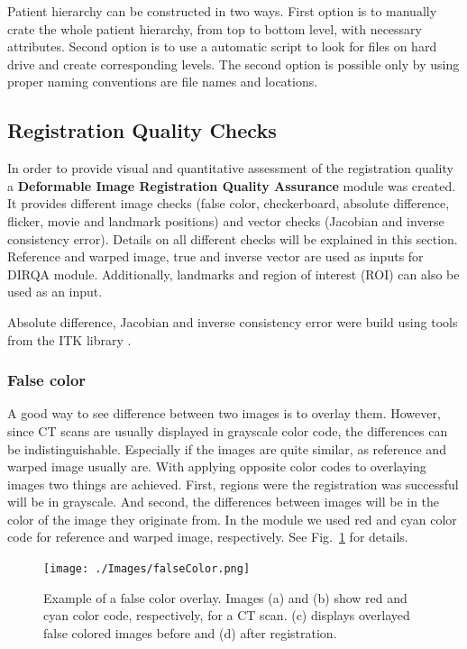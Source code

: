\documentclass[type=dr, dr=rernat, accentcolor=tud7b,colorbacktitle, bigchapter, openright, twoside, 12pt ]{tudthesis}
\begin{document}
Patient hierarchy can be constructed in two ways. First option is to manually crate the whole patient hierarchy, from top to bottom level, with necessary attributes. Second option is to use a automatic script to look 
for files on hard drive and create corresponding levels. The second option is possible only by using proper naming conventions are file names and locations.

\subsection{Registration Quality Checks}
\label{DIRQA}

In order to provide visual and quantitative assessment of the registration quality a \textbf{Deformable Image Registration Quality Assurance} module was created. It provides different image checks (false color, checkerboard, absolute difference, flicker, movie and landmark positions) and vector checks (Jacobian and inverse consistency error). Details on all different checks will be explained in this section. Reference and warped image, true and inverse vector are used as inputs for DIRQA module. Additionally, landmarks and region of interest (ROI) can also be used as an input.

Absolute difference, Jacobian and inverse consistency error were build using tools from the ITK library \cite{Yoo2002}.

\subsubsection{False color}
\label{Sec:FalseColor}

A good way to see difference between two images is to overlay them. However, since CT scans are usually displayed in grayscale color code, the differences can be indistinguishable. Especially if the images are quite similar, as reference and warped image usually are. With applying opposite color codes to overlaying images two things are achieved. First, regions were the registration was successful will be in grayscale. And second, the differences between images will be in the color of the image they originate from. In the module we used red and cyan color code for reference and warped image, respectively. See Fig.~\ref{falseColor} for details.

\begin{figure}[H]
	\begin{center}		
		\texttt{[image: ./Images/falseColor.png]}
		\caption{Example of a false color overlay. Images (a) and (b) show red and cyan color code, respectively, for a CT scan. (c) displays overlayed false colored images before and (d) after registration.}
		\label{falseColor}
	\end{center}
\end{figure}
\end{document}
